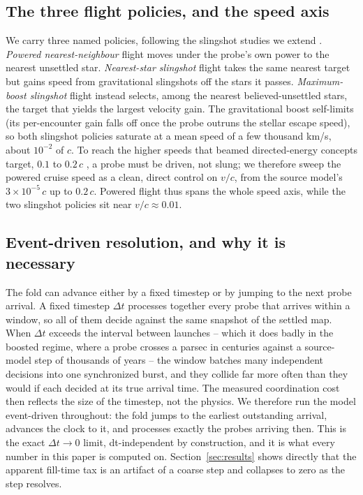 \subsection{The three flight policies, and the speed axis}
We carry three named policies, following the slingshot studies we extend
\citep{forgan-papadog-kitching-2013,nicholson-forgan-2013}. \emph{Powered nearest-neighbour}
flight moves under the probe's own power to the nearest unsettled star. \emph{Nearest-star
slingshot} flight takes the same nearest target but gains speed from gravitational slingshots
off the stars it passes. \emph{Maximum-boost slingshot} flight instead selects, among the
nearest believed-unsettled stars, the target that yields the largest velocity gain. The
gravitational boost self-limits (its per-encounter gain falls off once the probe outruns the
stellar escape speed), so both slingshot policies saturate at a mean speed of a few thousand
km/s, about $10^{-2}$ of $c$. To reach the higher speeds that beamed directed-energy
concepts target, $0.1$ to $0.2\,c$ \citep{lubin-2016}, a probe must be
driven, not slung; we therefore sweep the powered cruise speed as a clean, direct control on
$v/c$, from the source model's $3\times10^{-5}\,c$ up to $0.2\,c$. Powered flight thus spans the
whole speed axis, while the two slingshot policies sit near $v/c \approx 0.01$.

\subsection{Event-driven resolution, and why it is necessary}
The fold can advance either by a fixed timestep or by jumping to the next probe arrival. A
fixed timestep $\Delta t$ processes together every probe that arrives within
a window, so all of them decide against the same snapshot of the settled map. When $\Delta t$
exceeds the interval between launches -- which it does badly in the boosted regime, where a
probe crosses a parsec in centuries against a source-model step of thousands of years -- the
window batches many independent decisions into one synchronized burst, and they collide far
more often than they would if each decided at its true arrival time. The measured coordination
cost then reflects the size of the timestep, not the physics. We therefore run the model
event-driven throughout: the fold jumps to the earliest outstanding arrival, advances the clock
to it, and processes exactly the probes arriving then. This is the exact $\Delta t \to 0$ limit,
dt-independent by construction, and it is what every number in this paper is computed on.
Section~\ref{sec:results} shows directly that the apparent fill-time tax is an artifact of a
coarse step and collapses to zero as the step resolves.

